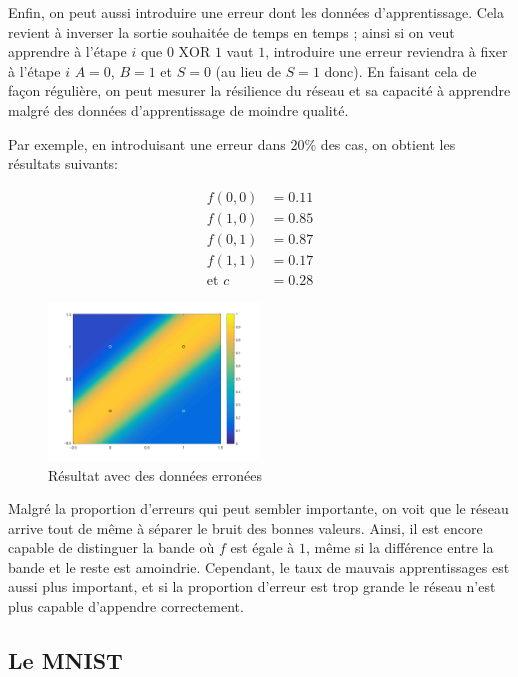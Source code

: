 Enfin, on peut aussi introduire une erreur dont les données d'apprentissage. Cela revient à inverser la sortie souhaitée de temps en temps ; ainsi si on veut apprendre à l'étape $i$ que $0 \text{ XOR } 1$ vaut $1$, introduire une erreur reviendra à fixer à l'étape $i$ $A = 0$, $B = 1$ et $S = 0$ (au lieu de $S = 1$ donc). En faisant cela de façon régulière, on peut mesurer la résilience du réseau et sa capacité à apprendre malgré des données d'apprentissage de moindre qualité.

Par exemple, en introduisant une erreur dans $20\%$ des cas, on obtient les résultats suivants:

\[\begin{split}
f(0, 0) &= 0.11 \\
f(1, 0) &= 0.85 \\
f(0, 1) &= 0.87 \\
f(1, 1) &= 0.17 \\
\text{et }c &= 0.28
\end{split}\]

\begin{figure}[!ht]
\begin{center}
  \includegraphics[width=0.5\textwidth]{images/xor4.png}
\end{center}
\caption{Résultat avec des données erronées}
\end{figure}

Malgré la proportion d'erreurs qui peut sembler importante, on voit que le réseau arrive tout de même à séparer le bruit des bonnes valeurs. Ainsi, il est encore capable de distinguer la bande où $f$ est égale à $1$, même si la différence entre la bande et le reste est amoindrie. Cependant, le taux de mauvais apprentissages est aussi plus important, et si la proportion d'erreur est trop grande le réseau n'est plus capable d'appendre correctement.


\subsection{Le MNIST}

